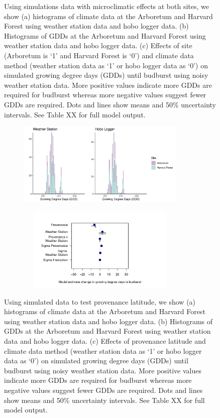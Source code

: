\documentclass{article}\usepackage[]{graphicx}\usepackage[]{color}
\begin{document}
\begin{figure}
\caption{ Using simulations data with microclimatic effects at both sites, we show (a) histograms of climate data at the Arboretum and Harvard Forest using weather station data and hobo logger data. (b) Histograms of GDDs at the Arboretum and Harvard Forest using weather station data and hobo logger data. (c) Effects of site (Arboretum is `1' and Harvard Forest is `0') and climate data method (weather station data as `1' or hobo logger data as `0') on simulated growing degree days (GDDs) until budburst using noisy weather station data. More positive values indicate more GDDs are required for budburst whereas more negative values suggest fewer GDDs are required. Dots and lines show means and 50\% uncertainty intervals. See Table XX for full model output.}
\label{fig:micros}
\end{figure}

\begin{figure}
    \begin{subfigure}{.5\linewidth}
      \caption{}
      \centering
      \includegraphics[height=4cm, width=8cm]{..//analyses/figures/gdd_methods_prov.pdf}
    \label{fig:gddprov}
    \end{subfigure}
  \begin{subfigure}{.5\linewidth}
	    \caption{}
      \centering
      \includegraphics[height=4cm, width=8cm]{..//analyses/figures/muplot_prov.pdf}
      \label{fig:muplotprov}
  \end{subfigure}
\caption{ Using simulated data to test provenance latitude, we show (a) histograms of climate data at the Arboretum and Harvard Forest using weather station data and hobo logger data. (b) Histograms of GDDs at the Arboretum and Harvard Forest using weather station data and hobo logger data. (c) Effects of provenance latitude and climate data method (weather station data as `1' or hobo logger data as `0') on simulated growing degree days (GDDs) until budburst using noisy weather station data. More positive values indicate more GDDs are required for budburst whereas more negative values suggest fewer GDDs are required. Dots and lines show means and 50\% uncertainty intervals. See Table XX for full model output.}
\label{fig:prov}
\end{figure}
\end{document}

